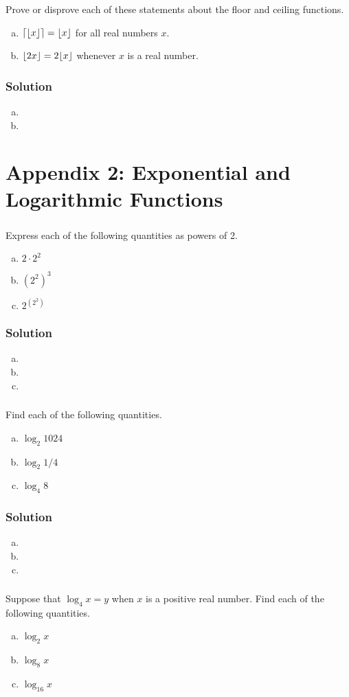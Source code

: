 \documentclass[11pt,a4paper,multicol]{article}
\newcommand{\chapter}[2]{%
\setcounter{section}{#1}%
\addtocounter{section}{-1}%
\section{#2}%
}
\newcommand{\problem}[1]{%
\setcounter{subsubsection}{#1}%
\addtocounter{subsubsection}{-1}%
\subsubsection{\hfill}%
}
\newenvironment{subproblem}
	{\begin{enumerate}[a)]}
	{\end{enumerate}}
\newcommand{\solution}{%
\subsubsection*{Solution}%
}
\DeclarePairedDelimiter{\ceil}{\lceil}{\rceil}
\DeclarePairedDelimiter{\floor}{\lfloor}{\rfloor}
\begin{document}
		\problem{74}
			Prove or disprove each of these statements about the floor and ceiling functions.
			\begin{subproblem}
				\item $\ceil{\floor{x}} = \floor{x}$ for all real numbers $x$.
				\item $\floor{2x} = 2\floor{x}$ whenever $x$ is a real number.
			\end{subproblem}
		\solution
			\begin{subproblem}
				\item
				\item
			\end{subproblem}
			
\chapter{2}{Appendix 2: Exponential and Logarithmic Functions}

		\problem{1}
			Express each of the following quantities as powers of 2.
			\begin{subproblem}
				\item $2 \cdot 2^2$
				\item $(2^2)^3$
				\item $2^{(2^2)}$
			\end{subproblem}
		\solution
			\begin{subproblem}
				\item
				\item
				\item
			\end{subproblem}

		\problem{2}
			Find each of the following quantities.
			\begin{subproblem}
				\item $\log_2 1024$
				\item $\log_2 1/4$
				\item $\log_4 8$
			\end{subproblem}
		\solution
			\begin{subproblem}
				\item
				\item
				\item
			\end{subproblem}
			
		\problem{3}
			Suppose that $\log_4 x = y$ when $x$ is a positive real number.
			Find each of the following quantities.
			\begin{subproblem}
				\item $\log_2 x$
				\item $\log_8 x$
				\item $\log_{16} x$
			\end{subproblem}
			
\end{document}
